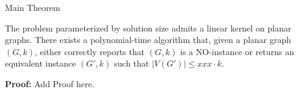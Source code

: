 \begin{frame}[c]{Main Theorem}
\begin{tcolorbox}[colback=TUMBlueLighter,title=The Main Theorem]
    The \sdom problem parameterized by solution size admits a linear kernel on planar graphs.
    There exists a polynomial-time algorithm that, given a planar graph $(G, k)$, either correctly reports that $(G, k)$ is a NO-instance or returns an equivalent instance $(G', k)$ such that $|V(G')| \leq xxx \cdot k$.
\end{tcolorbox}
\textbf{Proof: } Add Proof here.
\end{frame}

